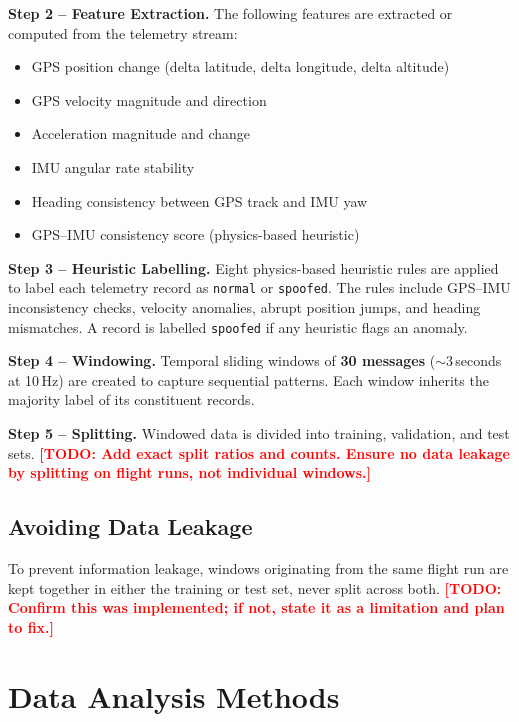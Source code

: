 \documentclass[11pt,a4paper]{article}
\newcommand{\todo}[1]{\textcolor{red}{\textbf{[TODO: #1]}}}
\begin{document}
\textbf{Step 2 -- Feature Extraction.} The following features are extracted or computed from the telemetry stream:
\begin{itemize}
    \item GPS position change (delta latitude, delta longitude, delta altitude)
    \item GPS velocity magnitude and direction
    \item Acceleration magnitude and change
    \item IMU angular rate stability
    \item Heading consistency between GPS track and IMU yaw
    \item GPS--IMU consistency score (physics-based heuristic)
\end{itemize}

\textbf{Step 3 -- Heuristic Labelling.} Eight physics-based heuristic rules are applied to label each telemetry record as \texttt{normal} or \texttt{spoofed}. The rules include GPS--IMU inconsistency checks, velocity anomalies, abrupt position jumps, and heading mismatches. A record is labelled \texttt{spoofed} if any heuristic flags an anomaly.

\textbf{Step 4 -- Windowing.} Temporal sliding windows of \textbf{30 messages} ($\sim$3\,seconds at 10\,Hz) are created to capture sequential patterns. Each window inherits the majority label of its constituent records.

\textbf{Step 5 -- Splitting.} Windowed data is divided into training, validation, and test sets. \todo{Add exact split ratios and counts. Ensure no data leakage by splitting on flight runs, not individual windows.}

\subsection{Avoiding Data Leakage}

To prevent information leakage, windows originating from the same flight run are kept together in either the training or test set, never split across both. \todo{Confirm this was implemented; if not, state it as a limitation and plan to fix.}

\section{Data Analysis Methods}
\end{document}

